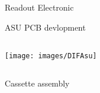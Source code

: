 \documentclass[10pt]{beamer}
\begin{document}
\begin{frame}[shrink=3]{Readout Electronic}
\begin{block}{ASU PCB devlopment}
\begin{columns}
      \begin{column}{0.5\textwidth}
         \centerline{\texttt{[image: images/DIFAsu]}}
      \end{column}

    \end{columns}
\end{block}
\end{frame}
\begin{frame}{Cassette assembly}
\begin{columns}
      \begin{column}{0.5\textwidth}

        \begin{center}
        \end{center}
      \end{column}
\pause
      \begin{column}{0.5\textwidth}


\end{column}
\end{columns}
\end{frame}
\end{document}
